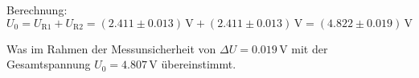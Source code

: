 \documentclass[12pt,a4paper,titlepage]{scrartcl}
\numberwithin{equation}{section}
\numberwithin{table}{section}
\numberwithin{figure}{section}
\begin{document}
\medskip
Berechnung: 
\begin{equation}
    U_0 = U_\text{R1} + U_\text{R2} = (2.411\pm 0.013)\,\text{V} + (2.411\pm 0.013)\,\text{V} = (4.822\pm 0.019)\,\text{V}
\end{equation}

Was im Rahmen der Messunsicherheit von $\Delta U = 0.019\,\text{V}$ mit der Gesamtspannung $U_0 = 4.807\,\text{V}$ übereinstimmt.

\end{document}
